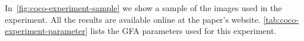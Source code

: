 \documentclass[review]{siamart220329}
\begin{document}
%
%
In~\cref{fig:coco-experiment-sample} we show a sample of the images used in the
experiment. All the results are available online at the paper's website. 
\cref{tab:coco-experiment-parameter} lists the GFA parameters used for this
experiment.
%
%
\begin{figure}[t]
\center
{}


\end{figure}
\end{document}
